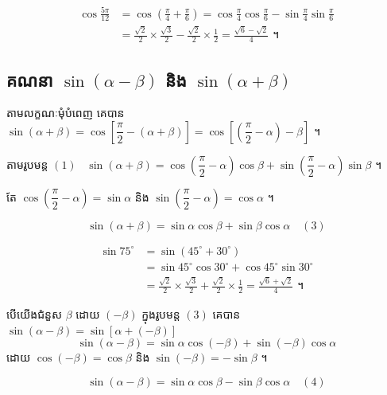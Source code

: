 \begin{example}[ឧទាហរណ៍ ៣]
\[
\begin{aligned}
\cos\frac{5\pi}{12} &= \cos\left(\frac{\pi}{4} + \frac{\pi}{6}\right) = \cos\frac{\pi}{4}\cos\frac{\pi}{6} - \sin\frac{\pi}{4}\sin\frac{\pi}{6}\\
&= \frac{\sqrt{2}}{2} \times \frac{\sqrt{3}}{2} - \frac{\sqrt{2}}{2} \times \frac{1}{2} = \frac{\sqrt{6} - \sqrt{2}}{4} \text{ ។}
\end{aligned}
\]
\end{example}

\subsection{គណនា \texorpdfstring{$\sin(\alpha - \beta)$}{sin(α − β)} និង \texorpdfstring{$\sin(\alpha + \beta)$}{sin(α + β)}}

តាមលក្ខណៈមុំបំពេញ គេបាន $\sin(\alpha + \beta) = \cos\left[\dfrac{\pi}{2} - (\alpha + \beta)\right] = \cos\left[\left(\dfrac{\pi}{2} - \alpha\right) - \beta\right]$ ។

តាមរូបមន្ត $(1)$ \ $\sin(\alpha + \beta) = \cos\left(\dfrac{\pi}{2} - \alpha\right)\cos\beta + \sin\left(\dfrac{\pi}{2} - \alpha\right)\sin\beta$ ។

តែ $\cos\left(\dfrac{\pi}{2} - \alpha\right) = \sin\alpha$ និង $\sin\left(\dfrac{\pi}{2} - \alpha\right) = \cos\alpha$ ។
\begin{formulaBox}[ដូច្នេះ]
\[ \sin(\alpha + \beta) = \sin\alpha\cos\beta + \sin\beta\cos\alpha \quad (3) \]
\end{formulaBox}

\begin{example}[ឧទាហរណ៍ ៤]
\[
\begin{aligned}
\sin 75^\circ &= \sin(45^\circ + 30^\circ)\\
&= \sin 45^\circ\cos 30^\circ + \cos 45^\circ\sin 30^\circ\\
&= \frac{\sqrt{2}}{2} \times \frac{\sqrt{3}}{2} + \frac{\sqrt{2}}{2} \times \frac{1}{2} = \frac{\sqrt{6} + \sqrt{2}}{4} \text{ ។}
\end{aligned}
\]
\end{example}

បើយើងជំនួស $\beta$ ដោយ $(-\beta)$ ក្នុងរូបមន្ត $(3)$ គេបាន $\sin(\alpha - \beta) = \sin[\alpha + (-\beta)]$
\[ \sin(\alpha - \beta) = \sin\alpha\cos(-\beta) + \sin(-\beta)\cos\alpha \]
ដោយ $\cos(-\beta) = \cos\beta$ និង $\sin(-\beta) = -\sin\beta$ ។
\begin{formulaBox}[ដូច្នេះ]
\[ \sin(\alpha - \beta) = \sin\alpha\cos\beta - \sin\beta\cos\alpha \quad (4) \]
\end{formulaBox}

